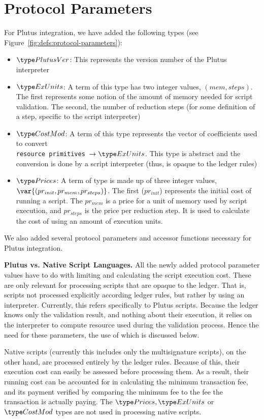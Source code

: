 \section{Protocol Parameters}
\label{sec:protocol-parameters}

For Plutus integration, we have added the following types
(see Figure~\ref{fig:defs:protocol-parameters}):

\begin{itemize}
\item $\PlutusVer$: This represents the version number of the Plutus interpreter
\item $\ExUnits$: A term of this type has two integer values, $(mem, steps)$. The first
represents some notion of the amount of memory needed for script validation.
The second, the number of reduction steps (for some definition of a step, specific
to the script interpreter)
\item $\CostMod$: A term of this type represents the vector of coefficients used to convert \\
\texttt{resource primitives}~$\to \ExUnits$. This type is abstract and the
conversion is done by a script interpreter (thus, is opaque to the ledger rules)
\item $\Prices$: A term of type is made up of three integer values,
$\var{(pr_{init}, pr_{mem}, pr_{steps})}$. The first ($pr_{init}$) represents the initial
cost of running a script. The $pr_{mem}$ is a price for a unit of memory
used by script execution, and $pr_{steps}$ is the price per
reduction step. It is used to calculate the cost of using an amount of execution
units.
\end{itemize}

We also added several protocol parameters and accessor functions necessary for
Plutus integration.

\textbf{Plutus vs. Native Script Languages.}
All the newly added protocol parameter values have to do with limiting and calculating
the script execution cost.
These are only relevant for processing scripts that are opaque
to the ledger. That is, scripts not processed explicitly according ledger rules,
but rather by using an interpreter. Currently, this refers specifically
to Plutus scripts. Because the ledger knows only the validation result, and
nothing about their execution, it relies on the interpreter to compute resource
used during the validation process. Hence the need for these parameters,
the use of which is discussed below.

Native scripts (currently this includes only the multisignature scripts), on the
other hand, are processed entirely by the ledger rules.
Because of this, their execution cost can easily be assessed before processing them.
As a result, their running cost can be accounted for in calculating the minimum transaction
fee, and its payment verified by comparing the minimum fee to the fee the transaction
is actually paying. The $\Prices, \ExUnits$ or $\CostMod$ types are not used
in processing native scripts.


